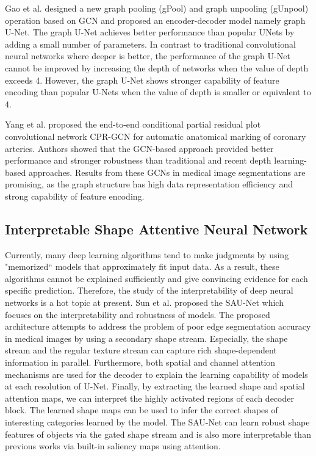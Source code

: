 Gao et al. designed a new graph pooling (gPool) and graph unpooling (gUnpool)
operation based on GCN and proposed an encoder-decoder model namely graph U-Net.
The graph U-Net achieves better performance than popular UNets by adding a small
number of parameters. In contrast to traditional convolutional neural networks
where deeper is better, the performance of the graph U-Net cannot be improved by
increasing the depth of networks when the value of depth exceeds 4. However, the
graph U-Net shows stronger capability of feature encoding than popular U-Nets
when the value of depth is smaller or equivalent to 4.

Yang et al. proposed the end-to-end conditional partial residual plot
convolutional network CPR-GCN for automatic anatomical marking of coronary
arteries. Authors showed that the GCN-based approach provided better performance
and stronger robustness than traditional and recent depth learning-based
approaches. Results from these GCNs in medical image segmentations are
promising, as the graph structure has high data representation efficiency and
strong capability of feature encoding.

\subsection{Interpretable Shape Attentive Neural Network}
Currently, many deep learning algorithms tend to make judgments by using
"memorized`` models that approximately fit input data. As a result, these
algorithms cannot be explained sufficiently and give convincing evidence for
each specific prediction. Therefore, the study of the interpretability of deep
neural networks is a hot topic at present. Sun et al. proposed the SAU-Net which
focuses on the interpretability and robustness of models. The proposed
architecture attempts to address the problem of poor edge segmentation accuracy
in medical images by using a secondary shape stream. Especially, the shape stream
and the regular texture stream can capture rich shape-dependent information in
parallel. Furthermore, both spatial and channel attention mechanisms are used for
the decoder to explain the learning capability of models at each resolution of
U-Net. Finally, by extracting the learned shape and spatial attention maps, we
can interpret the highly activated regions of each decoder block. The learned
shape maps can be used to infer the correct shapes of interesting categories learned
by the model. The SAU-Net can learn robust shape features of objects via
the gated shape stream and is also more interpretable than previous works via
built-in saliency maps using attention.

